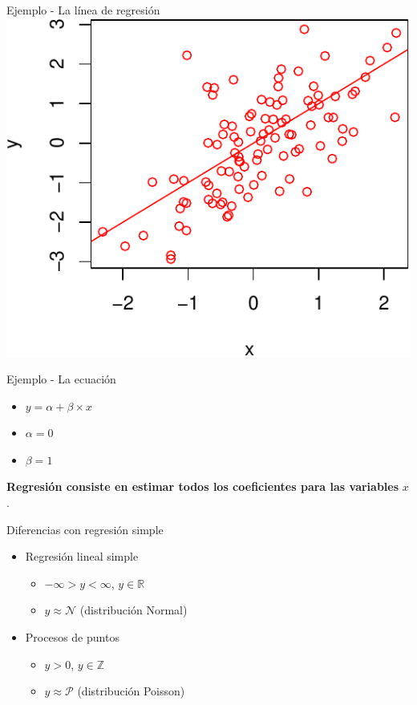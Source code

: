 \documentclass[
  11pt,
  ignorenonframetext,
]{beamer}
\providecommand{\tightlist}{%
  \setlength{\itemsep}{0pt}\setlength{\parskip}{0pt}}
\begin{document}
\begin{frame}{Ejemplo - La línea de regresión}
\protect\hypertarget{ejemplo---la-luxednea-de-regresiuxf3n}{}
\includegraphics{Generalidades_files/figure-beamer/unnamed-chunk-3-1.pdf}
\end{frame}

\begin{frame}{Ejemplo - La ecuación}
\protect\hypertarget{ejemplo---la-ecuaciuxf3n}{}
\begin{itemize}
\item
  \(y = \alpha + \beta \times x\)
\item
  \(\alpha = 0\)
\item
  \(\beta = 1\)
\end{itemize}

\textbf{Regresión consiste en estimar todos los coeficientes para las
variables} \(x\).
\end{frame}

\begin{frame}{Diferencias con regresión simple}
\protect\hypertarget{diferencias-con-regresiuxf3n-simple}{}
\begin{itemize}
\item
  Regresión lineal simple

  \begin{itemize}
  \tightlist
  \item
    \(-\infty > y < \infty\), \(y \in \mathbb{R}\)
  \item
    \(y \approx \mathcal{N}\) (distribución Normal)
  \end{itemize}
\item
  Procesos de puntos

  \begin{itemize}
  \tightlist
  \item
    \(y > 0\), \(y \in \mathbb{Z}\)
  \item
    \(y \approx \mathcal{P}\) (distribución Poisson)
  \end{itemize}
\end{itemize}
\end{frame}
\end{document}
